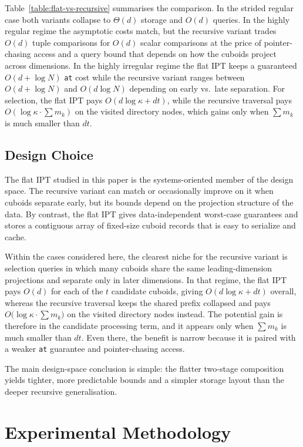 \documentclass[manuscript,screen,review]{acmart}
\theoremstyle{definition}
\theoremstyle{plain}
\begin{document}
\medskip
\noindent
Table~\ref{table:flat-vs-recursive} summarises the comparison.
In the strided regular case
both variants collapse to $\Theta(d)$ storage and $O(d)$ queries. In
the highly regular regime the asymptotic costs match, but the
recursive variant trades $O(d)$ tuple comparisons for $O(d)$ scalar
comparisons at the price of pointer-chasing access and a query bound
that depends on how the cuboids project across dimensions. In the
highly irregular regime the flat IPT keeps a guaranteed $O(d+\log N)$
\texttt{at} cost while the recursive variant ranges between
$O(d+\log N)$ and $O(d\log N)$ depending on early vs.\ late
separation. For selection, the flat IPT pays
$O(d\log\kappa+dt)$, while the recursive traversal pays
$O(\log\kappa\cdot\sum m_k)$ on the visited directory nodes, which
gains only when $\sum m_k$ is much smaller than $dt$.

\subsection{Design Choice}

The flat IPT studied in this paper is the systems-oriented member of
the design space. The recursive variant can match or occasionally
improve on it when cuboids separate early, but its bounds depend on
the projection structure of the data. By contrast, the flat IPT gives
data-independent worst-case guarantees and stores a contiguous array of
fixed-size cuboid records that is easy to serialize and cache.

Within the cases considered here, the clearest niche for the recursive
variant is selection queries in which many cuboids share the same
leading-dimension projections and separate only in later dimensions.
In that regime, the flat IPT pays $O(d)$ for each of the $t$ candidate
cuboids, giving $O(d\log\kappa+dt)$ overall, whereas the recursive
traversal keeps the shared prefix collapsed and pays
$O\!\bigl(\log\kappa\cdot\sum m_k\bigr)$ on the visited directory
nodes instead. The potential gain is therefore in the candidate
processing term, and it appears only when $\sum m_k$ is much smaller
than $dt$. Even there, the benefit is narrow because it is paired with
a weaker \texttt{at} guarantee and pointer-chasing access.

The main design-space conclusion is simple: the flatter two-stage
composition yields tighter, more predictable bounds and a simpler
storage layout than the deeper recursive generalisation.

\section{Experimental Methodology}
\label{section:methodology}
\end{document}
